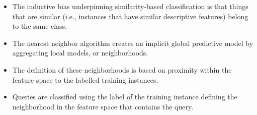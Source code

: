 \documentclass[xcolor={table}]{beamer}
\begin{document}
\begin{frame}
\begin{itemize}
\item The inductive bias underpinning similarity-based classification is that things that are similar (i.e., instances that have similar descriptive features) belong to the same class. 
\item The nearest neighbor algorithm creates an implicit global predictive model by aggregating local models, or neighborhoods.
\item The definition of these neighborhoods is based on proximity within the feature space to the labelled training instances.
\item Queries are classified using the label of the training instance defining the neighborhood in the feature space that contains the query.  
\end{itemize}
\end{frame}


\begin{frame}
	\tableofcontents
\end{frame}
\end{document}

